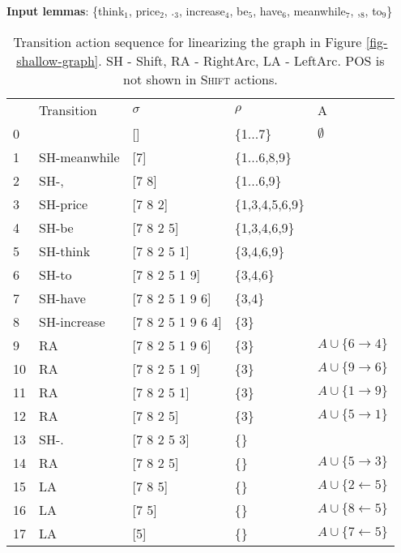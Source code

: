 \documentclass[11pt]{article}
\begin{document}
\begin{table}[t]
\centering
\scriptsize
\begin{tablenotes}
\item \textbf{Input lemmas}: \{think$_1$, price$_2$, .$_3$, increase$_4$,  be$_5$, have$_6$, meanwhile$_7$, ,$_8$, to$_9$\} 
\end{tablenotes}
\vspace*{0.5em}
\begin{tabular}{llp{1.5cm}p{1cm}l}
\hline
  & Transition     & $\sigma$    & $\rho$     & A \\
0 &                & []          & \{1...7\} & $\emptyset$                 \\ 
1 & {\sc SH}-meanwhile    & [7]         & \{1...6,8,9\} &                             \\ 2 & {\sc SH}-,    & [7 8]         & \{1...6,9\} &                             \\ 3 & {\sc SH}-price    & [7 8 2]       & \{1,3,4,5,6,9\} &                             \\ 4 & {\sc SH}-be    & [7 8 2 5]     & \{1,3,4,6,9\} &                             \\ 5 & {\sc SH}-think    & [7 8 2 5 1]   & \{3,4,6,9\}   &                             \\ 6 & {\sc SH}-to    & [7 8 2 5 1 9]   & \{3,4,6\}   &                             \\ 7 & {\sc SH}-have    & [7 8 2 5 1 9 6]   & \{3,4\}   &                             \\ 8 & {\sc SH}-increase    & [7 8 2 5 1 9 6 4]   & \{3\}   &                             \\ 9 & {\sc RA} & [7 8 2 5 1 9 6]   & \{3\}    & $A \cup \{6\rightarrow 4\}$ \\ 10 & {\sc RA} & [7 8 2 5 1 9]   & \{3\}     & $A \cup \{9\rightarrow 6\}$ \\ 11 & {\sc RA} & [7 8 2 5 1]     & \{3\}     & $A \cup \{1\rightarrow 9\}$ \\ 12 & {\sc RA} & [7 8 2 5]       & \{3\}     & $A \cup \{5\rightarrow 1\}$ \\ 13 & {\sc SH}-.    & [7 8 2 5 3]     & \{\}      &                             \\ 14& {\sc RA} & [7 8 2 5]       & \{\}      & $A \cup \{5\rightarrow 3\}$ \\ 15& {\sc LA}  & [7 8 5]         & \{\}      & $A \cup \{2\leftarrow 5\}$  \\ 16& {\sc LA}  & [7 5]         & \{\}      & $A \cup \{8\leftarrow 5\}$  \\ 17& {\sc LA}  & [5]         & \{\}      & $A \cup \{7\leftarrow 5\}$  \\ 

\hline
\end{tabular}
\caption{Transition action sequence for linearizing the graph in Figure \ref{fig-shallow-graph}. SH  - {\sc Shift}, RA - {\sc RightArc}, LA - {\sc LeftArc}. POS is not shown in \textsc{Shift} actions.}
\label{tbl:arc-standard-shallow-linearization}
\vspace*{-0.5em}
\end{table}	
  
\end{document}
